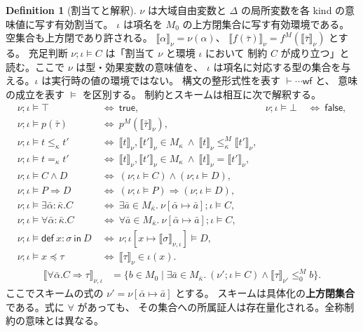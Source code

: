 \documentclass[a4paper,11pt]{article}
\theoremstyle{definition}
\newtheorem{definition}{Definition}[section]
\newcommand{\den}[1]{\llbracket #1\rrbracket}
\newcommand{\inst}[2]{#1\preccurlyeq #2}
\newcommand{\Def}[3]{\mathsf{def}\ #1:#2\ \mathsf{in}\ #3}
\begin{document}
\begin{definition}[割当てと解釈]
$\nu$ は大域自由変数と $\Delta$ の局所変数を各 kind の意味値に写す有効割当て。
$\iota$ は項名を $M_0$ の上方閉集合に写す有効環境である。
空集合も上方閉であり許される。
$\den\alpha_\nu=\nu(\alpha)$、
$\den{f(\bar\tau)}_\nu=f^M(\den{\bar\tau}_\nu)$ とする。
充足判断 $\nu;\iota\models C$ は「割当て $\nu$ と環境 $\iota$ において
制約 $C$ が成り立つ」と読む。ここで $\nu$ は型・効果変数の意味値を、
$\iota$ は項名に対応する型の集合を与える。$\iota$ は実行時の値の環境ではない。
構文の整形式性を表す $\vdash\cdots\mathsf{wf}$ と、
意味の成立を表す $\models$ を区別する。
制約とスキームは相互に次で解釈する。
\begin{align*}
 \nu;\iota\models\top&\ \Longleftrightarrow\ \mathsf{true},&
 \nu;\iota\models\bot&\ \Longleftrightarrow\ \mathsf{false},\\
 \nu;\iota\models p(\bar\tau)&\ \Longleftrightarrow\ p^M(\den{\bar\tau}_\nu),\\
 \nu;\iota\models t\leq_\kappa t'&\ \Longleftrightarrow\
 \den t_\nu,\den{t'}_\nu\in M_\kappa\ \land\ \den t_\nu\leq^M_\kappa\den{t'}_\nu,\\
 \nu;\iota\models t=_\kappa t'&\ \Longleftrightarrow\
 \den t_\nu,\den{t'}_\nu\in M_\kappa\ \land\ \den t_\nu=\den{t'}_\nu,\\
 \nu;\iota\models C\land D&\ \Longleftrightarrow\
 (\nu;\iota\models C)\land(\nu;\iota\models D),\\
 \nu;\iota\models P\Rightarrow D&\ \Longleftrightarrow\
 (\nu;\iota\models P)\Rightarrow(\nu;\iota\models D),\\
 \nu;\iota\models\exists\bar\alpha:\bar\kappa.C&\ \Longleftrightarrow\
 \exists\bar a\in M_{\bar\kappa}.\ \nu[\bar\alpha\mapsto\bar a];\iota\models C,\\
 \nu;\iota\models\forall\bar\alpha:\bar\kappa.C&\ \Longleftrightarrow\
 \forall\bar a\in M_{\bar\kappa}.\ \nu[\bar\alpha\mapsto\bar a];\iota\models C,\\
 \nu;\iota\models\Def{x}{\sigma}{D}&\ \Longleftrightarrow\
 \nu;\iota[x\mapsto\den\sigma_{\nu,\iota}]\models D,\\
 \nu;\iota\models\inst{x}{\tau}&\ \Longleftrightarrow\ \den\tau_\nu\in\iota(x).
\end{align*}
\begin{align*}
 \den{\forall\bar\alpha.C\Rightarrow\tau}_{\nu,\iota}
 &=\{b\in M_0\mid\exists\bar a\in M_{\bar\kappa}.\
      (\nu';\iota\models C)\land\den\tau_{\nu'}\leq^M_0 b\}.
\end{align*}
ここでスキームの式の $\nu'=\nu[\bar\alpha\mapsto\bar a]$ とする。
スキームは具体化の\textbf{上方閉集合}である。式に $\forall$ があっても、
その集合への所属証人は存在量化される。全称制約の意味とは異なる。
\end{definition}
\end{document}

